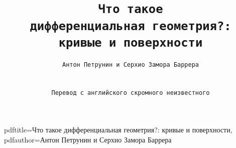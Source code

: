 \hypersetup
{
pdftitle={Что такое дифференциальная геометрия?: кривые и поверхности},
pdfauthor={Антон Петрунин и  Серхио Замора Баррера}
}

\title{\tt Что такое\\ дифференциальная геометрия?:\\
кривые и поверхности}

\author{\tt Антон Петрунин и \tt  Серхио Замора Баррера\\
\\
\\ \tt Перевод с английского скромного неизвестного}

\date{}

\maketitle

\thispagestyle{empty}
